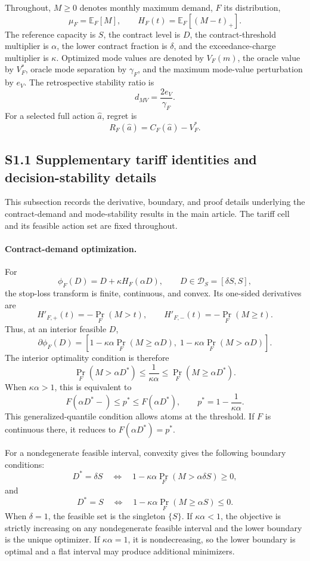 \documentclass[]{interact}
\begin{document}
Throughout, \(M\geq0\) denotes monthly maximum demand,
\(F\) its distribution,
\[
\mu_F=\mathbb E_F[M],
\qquad
H_F(t)=\mathbb E_F[(M-t)_+].
\]
The reference capacity is \(S\), the contract level is \(D\),
the contract-threshold multiplier is \(\alpha\), the lower contract
fraction is \(\delta\), and the exceedance-charge multiplier is
\(\kappa\). Optimized mode values are denoted by \(V_F(m)\),
the oracle value by \(V_F^\ast\), oracle mode separation by
\(\gamma_F\), and the maximum mode-value perturbation by \(e_V\).
The retrospective stability ratio is
\[
d_{MV}=\frac{2e_V}{\gamma_F}.
\]
For a selected full action \(\widehat a\), regret is
\[
R_F(\widehat a)
=
C_F(\widehat a)-V_F^\ast.
\]



\subsection*{S1.1 Supplementary tariff identities and decision-stability details}

This subsection records the derivative, boundary, and proof details
underlying the contract-demand and mode-stability results in the main
article. The tariff cell and its feasible action set are fixed
throughout.

\paragraph*{Contract-demand optimization.}
For
\[
\phi_F(D)=D+\kappa H_F(\alpha D),
\qquad D\in\mathcal D_S=[\delta S,S],
\]
the stop-loss transform is finite, continuous, and convex. Its
one-sided derivatives are
\[
H'_{F,+}(t)=-\Pr_F(M>t),
\qquad
H'_{F,-}(t)=-\Pr_F(M\geq t).
\]
Thus, at an interior feasible $D$,
\[
\partial\phi_F(D)
=
\left[
1-\kappa\alpha\Pr_F(M\geq\alpha D),
\;
1-\kappa\alpha\Pr_F(M>\alpha D)
\right].
\]
The interior optimality condition is therefore
\[
\Pr_F(M>\alpha D^\ast)
\leq\frac{1}{\kappa\alpha}
\leq\Pr_F(M\geq\alpha D^\ast).
\]
When $\kappa\alpha>1$, this is equivalent to
\[
F(\alpha D^\ast-)\leq p^\ast\leq F(\alpha D^\ast),
\qquad
p^\ast=1-\frac{1}{\kappa\alpha}.
\]
This generalized-quantile condition allows atoms at the threshold. If
$F$ is continuous there, it reduces to $F(\alpha D^\ast)=p^\ast$.

For a nondegenerate feasible interval, convexity gives the following
boundary conditions:
\[
D^\ast=\delta S
\quad\Longleftrightarrow\quad
1-\kappa\alpha\Pr_F(M>\alpha\delta S)\geq0,
\]
and
\[
D^\ast=S
\quad\Longleftrightarrow\quad
1-\kappa\alpha\Pr_F(M\geq\alpha S)\leq0.
\]
When $\delta=1$, the feasible set is the singleton $\{S\}$. If
$\kappa\alpha<1$, the objective is strictly increasing on any
nondegenerate feasible interval and the lower boundary is the unique
optimizer. If $\kappa\alpha=1$, it is nondecreasing, so the lower
boundary is optimal and a flat interval may produce additional
minimizers.
\end{document}
